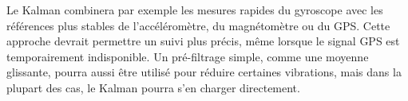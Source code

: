 \vspace{1em}

Le Kalman combinera par exemple les mesures rapides du gyroscope avec les références plus stables de l’accéléromètre, du magnétomètre ou du GPS. Cette approche devrait permettre un suivi plus précis, même lorsque le signal GPS est temporairement indisponible. Un pré-filtrage simple, comme une moyenne glissante, pourra aussi être utilisé pour réduire certaines vibrations, mais dans la plupart des cas, le Kalman pourra s’en charger directement.

\vspace{2em}

